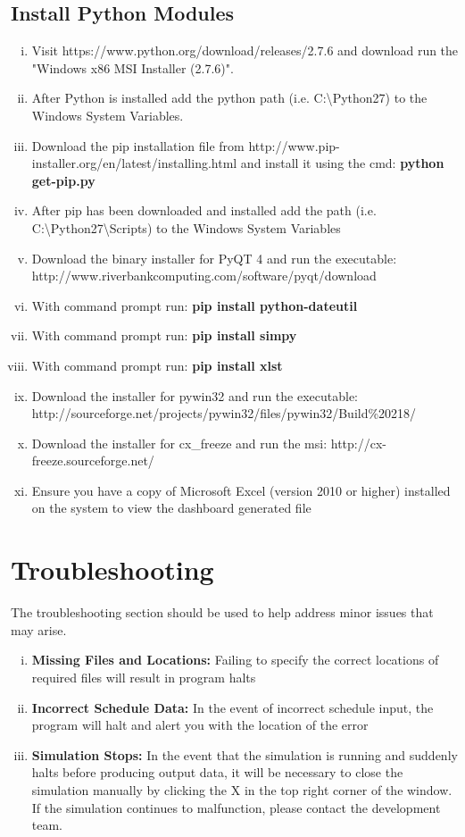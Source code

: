 \documentclass[paper=letter, fontsize=10pt]{scrartcl}
\numberwithin{equation}{section}		%
\numberwithin{figure}{section}			%
\numberwithin{table}{section}				%
\begin{document}
\subsection{Install Python Modules}
\begin{enumerate}[(i)]
	\item Visit https://www.python.org/download/releases/2.7.6 and download run the "Windows x86 MSI Installer (2.7.6)".
	\item After Python is installed add the python path (i.e. C:\textbackslash{Python27}) to the Windows System Variables.
	\item Download the pip installation file from http://www.pip-installer.org/en/latest/installing.html and install it using the cmd: \textbf{python get-pip.py}
	\item After pip has been downloaded and installed add the path (i.e. C:\textbackslash{Python27}\textbackslash{Scripts}) to the Windows System Variables
	\item Download the binary installer for PyQT 4 and run the executable: http://www.riverbankcomputing.com/software/pyqt/download
	\item With command prompt run: \textbf{pip install python-dateutil}
	\item With command prompt run: \textbf{pip install simpy}
	\item With command prompt run: \textbf{pip install xlst}
	\item Download the installer for pywin32 and run the executable: http://sourceforge.net/projects/pywin32/files/pywin32/Build\%20218/
	\item Download the installer for cx\_freeze and run the msi: http://cx-freeze.sourceforge.net/
	\item Ensure you have a copy of Microsoft Excel (version 2010 or higher) installed on the system to view the dashboard generated file 
\end{enumerate}

\section{Troubleshooting}
The troubleshooting section should be used to help address minor issues that may arise.

\begin{enumerate}[(i)]
	\item \textbf{Missing Files and Locations:} Failing to specify the correct locations of required files will result in program halts
	\item \textbf{Incorrect Schedule Data:} In the event of incorrect schedule input, the program will halt and alert you with the location of the error
	\item \textbf{Simulation Stops:} In the event that the simulation is running and suddenly halts before producing output data, it will be necessary to close the simulation manually by clicking the X in the top right corner of the window. If the simulation continues to malfunction, please contact the development team.
\end{enumerate}
\end{document}
